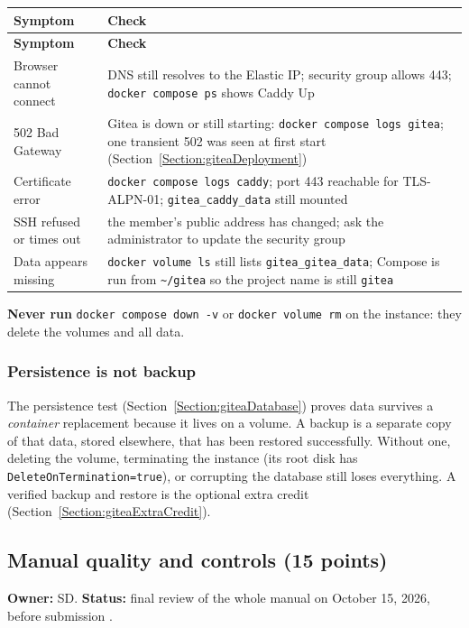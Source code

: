 \begin{tabularx}{\linewidth}{L{4.4cm}Y}
\caption{Troubleshooting\label{Table:GiteaTroubleshooting}}\\
\toprule \textbf{Symptom} & \textbf{Check}\\ \midrule
\endfirsthead
\toprule \textbf{Symptom} & \textbf{Check}\\ \midrule
\endhead \bottomrule \endlastfoot
Browser cannot connect & DNS still resolves to the Elastic IP; security group allows 443; \texttt{docker compose ps} shows Caddy Up\\
502 Bad Gateway & Gitea is down or still starting: \texttt{docker compose logs gitea}; one transient 502 was seen at first start (Section~\ref{Section:giteaDeployment})\\
Certificate error & \texttt{docker compose logs caddy}; port 443 reachable for TLS-ALPN-01; \texttt{gitea\_caddy\_data} still mounted\\
SSH refused or times out & the member's public address has changed; ask the administrator to update the security group\\
Data appears missing & \texttt{docker volume ls} still lists \texttt{gitea\_gitea\_data}; Compose is run from \texttt{\textasciitilde/gitea} so the project name is still \texttt{gitea}\\
\end{tabularx}
\textbf{Never run} \texttt{docker compose down -v} or \texttt{docker volume rm}
on the instance: they delete the volumes and all data.

\subsubsection{Persistence is not backup}
The persistence test (Section~\ref{Section:giteaDatabase}) proves data
survives a \emph{container} replacement because it lives on a volume. A backup
is a separate copy of that data, stored elsewhere, that has been restored
successfully. Without one, deleting the volume, terminating the instance (its
root disk has \texttt{DeleteOnTermination=true}), or corrupting the database
still loses everything. A verified backup and restore is the optional extra
credit (Section~\ref{Section:giteaExtraCredit}).

\subsection{Manual quality and controls (15 points)}
\label{Section:giteaManualQuality}
\textbf{Owner:} SD. \textbf{Status:} final review of the whole manual on
October 15, 2026, before submission \StatusPass.

